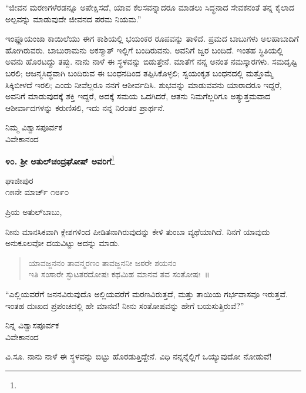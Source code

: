 “ಜೀವನ ಮರಣಗಳೆರಡನ್ನೂ ಅಪೇಕ್ಷಿಸದೆ, ಯಾವ ಕೆಲಸವನ್ನಾದರೂ ಮಾಡಲು ಸಿದ್ಧನಾದ ಸೇವಕನಂತೆ ತನ್ನ ಕೈಲಾದ ಅಲ್ಪವನ್ನು ಮಾಡುವುದೇ ಜೀವನದ ಪರಮ ನಿಯಮ.”

ಇಂಫ್ಲೂಯಂಜಾ ಕಾಯಿಲೆಯು ಈಗ ಕಾಶಿಯಲ್ಲಿ ಭಯಂಕರ ರೂಪವನ್ನು ತಾಳಿದೆ. ಪ್ರಮದ ಬಾಬುಗಳು ಅಲಹಾಬಾದಿಗೆ ಹೋಗಿರುವರು. ಬಾಬುರಾಮನು ಅಕಸ್ಮಾತ್ ಇಲ್ಲಿಗೆ ಬಂದಿರುವನು. ಅವನಿಗೆ ಜ್ವರ ಬಂದಿದೆ. ಇಂತಹ ಸ್ಥಿತಿಯಲ್ಲಿ ಅವನು ಹೊರಟದ್ದು ತಪ್ಪು. ನಾನು ನಾಳೆ ಈ ಸ್ಥಳವನ್ನು ಬಿಡುತ್ತೇನೆ. ಮಾತೆಗೆ ನನ್ನ ಅನಂತ ನಮಸ್ಕಾರಗಳು. ಸಮದೃಷ್ಟಿ ಬರಲಿ; ಆಜನ್ಮಸಿದ್ಧವಾಗಿ ಬಂದಿರುವ ಈ ಬಂಧನದಿಂದ ತಪ್ಪಿಸಿಕೊಳ್ಳಲಿ; ಸ್ವಯಂಕೃತ ಬಂಧನದಲ್ಲಿ ಮತ್ತೊಮ್ಮೆ ಸಿಕ್ಕಿಬೀಳದೆ ಇರಲಿ; ಎಂದು ನೀವೆಲ್ಲರೂ ನನಗೆ ಆಶೀರ್ವದಿಸಿ. ಶುಭವನ್ನು ಮಾಡುವವನು ಯಾರಾದರೂ ಇದ್ದರೆ, ಅವನಿಗೆ ಮಾಡುವುದಕ್ಕೆ ಶಕ್ತಿ ಇದ್ದರೆ, ಅದಕ್ಕೆ ಸಮಯ ಒದಗಿದರೆ, ಆತನು ನಿಮಗೆಲ್ಲರಿಗೂ ಅತ್ಯುತ್ತಮವಾದ ಆಶೀರ್ವಾದಗಳನ್ನು ಕರುಣಿಸಲಿ, ಇದು ನನ್ನ ನಿರಂತರ ಪ್ರಾರ್ಥನೆ.

\vspace{-0.5cm}

{\flushright
ನಿಮ್ಮ ವಿಶ್ವಾಸಪೂರ್ವಕ\\ವಿವೇಕಾನಂದ\par}

\begin{center}
\textbf{೪೦. ಶ‍್ರೀ ಅತುಲ್‌ಚಂದ್ರಘೋಷ್ ಅವರಿಗೆ}\footnote{}
\end{center}

\vspace{-0.5cm}

\begin{flushright}
ಘಾಜೀಪುರ\\೧೫ನೇ ಮಾರ್ಚ್ ೧೮೯೦
\end{flushright}

\noindent
ಪ್ರಿಯ ಅತುಲ್‌ಬಾಬು,

ನೀನು ಮಾನಸಿಕವಾಗಿ ಕ್ಲೇಶಗಳಿಂದ ಪೀಡಿತನಾಗಿರುವುದನ್ನು ಕೇಳಿ ತುಂಬಾ ವ್ಯಥೆಯಾಗಿದೆ. ನಿನಗೆ ಯಾವುದು ಅನುಕೂಲವೋ ದಯವಿಟ್ಟು ಅದನ್ನು ಮಾಡು.
\begin{verse}
 ಯಾವಜ್ಜನನಂ ತಾವನ್ಮರಣಂ ತಾವಜ್ಜನನೀ ಜಠರೇ ಶಯನಂ\\
 ಇತಿ ಸಂಸಾರೇ ಸ್ಫುಟತರದೋಷಃ ಕಥಮಿಹ ಮಾನವ ತವ ಸಂತೋಷಃ~॥ 
\end{verse}

“ಎಲ್ಲಿಯವರೆಗೆ ಜನನವಿರುವುದೊ ಅಲ್ಲಿಯವರೆಗೆ ಮರಣವಿರುತ್ತದೆ, ಮತ್ತು ತಾಯಿಯ ಗರ್ಭವಾಸವೂ ಇರುತ್ತವೆ. ಇಂತಹ ದುಃಖದ ಪ್ರಪಂಚದಲ್ಲಿ ಹೇ ಮಾನವ! ನೀನು ಸಂತೋಷವನ್ನು ಹೇಗೆ ಬಯಸುತ್ತಿರುವೆ?”

\vspace{-0.5cm}

\begin{flushright}
ನಿನ್ನ ವಿಶ್ವಾಸಪೂರ್ವಕ\\ವಿವೇಕಾನಂದ
\end{flushright}

ವಿ.ಸೂ. \enginline{-}ನಾನು ನಾಳೆ ಈ ಸ್ಥಳವನ್ನು ಬಿಟ್ಟು ಹೊರಡುತ್ತಿದ್ದೇನೆ. ವಿಧಿ ನನ್ನನ್ನೆಲ್ಲಿಗೆ ಒಯ್ಯುವುದೋ ನೋಡುವೆ!

